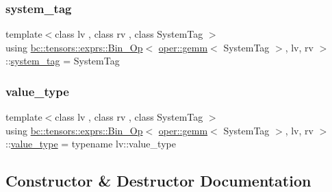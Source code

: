 \subsubsection{\texorpdfstring{system\+\_\+tag}{system\_tag}}
{\footnotesize\ttfamily template$<$class lv , class rv , class System\+Tag $>$ \\
using \hyperlink{structbc_1_1tensors_1_1exprs_1_1Bin__Op}{bc\+::tensors\+::exprs\+::\+Bin\+\_\+\+Op}$<$ \hyperlink{structbc_1_1oper_1_1gemm}{oper\+::gemm}$<$ System\+Tag $>$, lv, rv $>$\+::\hyperlink{structbc_1_1tensors_1_1exprs_1_1Bin__Op_3_01oper_1_1gemm_3_01SystemTag_01_4_00_01lv_00_01rv_01_4_a5779bf3375f157aac9c1493c560cfcd0}{system\+\_\+tag} =  System\+Tag}

\mbox{\label{structbc_1_1tensors_1_1exprs_1_1Bin__Op_3_01oper_1_1gemm_3_01SystemTag_01_4_00_01lv_00_01rv_01_4_abec313441ee9136354af1e196d186c92}} 
\subsubsection{\texorpdfstring{value\+\_\+type}{value\_type}}
{\footnotesize\ttfamily template$<$class lv , class rv , class System\+Tag $>$ \\
using \hyperlink{structbc_1_1tensors_1_1exprs_1_1Bin__Op}{bc\+::tensors\+::exprs\+::\+Bin\+\_\+\+Op}$<$ \hyperlink{structbc_1_1oper_1_1gemm}{oper\+::gemm}$<$ System\+Tag $>$, lv, rv $>$\+::\hyperlink{structbc_1_1tensors_1_1exprs_1_1Bin__Op_3_01oper_1_1gemm_3_01SystemTag_01_4_00_01lv_00_01rv_01_4_abec313441ee9136354af1e196d186c92}{value\+\_\+type} =  typename lv\+::value\+\_\+type}



\subsection{Constructor \& Destructor Documentation}
\mbox{\label{structbc_1_1tensors_1_1exprs_1_1Bin__Op_3_01oper_1_1gemm_3_01SystemTag_01_4_00_01lv_00_01rv_01_4_a14fe919a96786af35cc1e9b4bcf59d7c}} 
